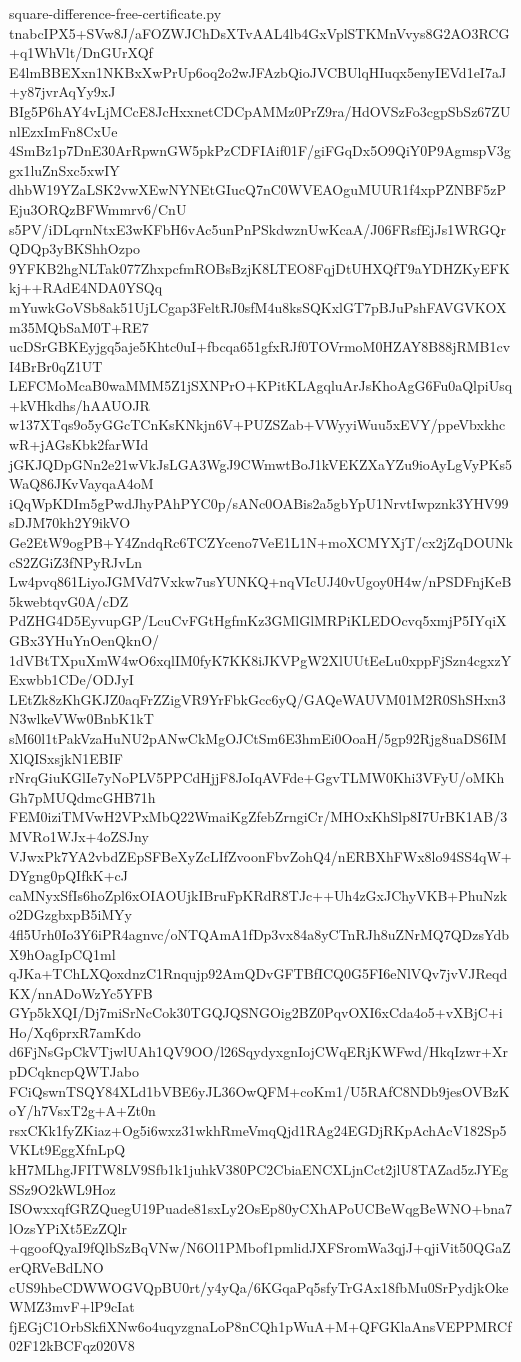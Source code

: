 \documentclass[11pt]{article}
\theoremstyle{definition}
\theoremstyle{remark}
\begin{document}
\begin{filecontents*}[overwrite]{square-difference-free-certificate.py}
tnabcIPX5+SVw8J/aFOZWJChDsXTvAAL4lb4GxVplSTKMnVvys8G2AO3RCG+q1WhVlt/DnGUrXQf
E4lmBBEXxn1NKBxXwPrUp6oq2o2wJFAzbQioJVCBUlqHIuqx5enyIEVd1eI7aJ+y87jvrAqYy9xJ
BIg5P6hAY4vLjMCcE8JcHxxnetCDCpAMMz0PrZ9ra/HdOVSzFo3cgpSbSz67ZUnlEzxImFn8CxUe
4SmBz1p7DnE30ArRpwnGW5pkPzCDFIAif01F/giFGqDx5O9QiY0P9AgmspV3ggx1luZnSxc5xwIY
dhbW19YZaLSK2vwXEwNYNEtGIucQ7nC0WVEAOguMUUR1f4xpPZNBF5zPEju3ORQzBFWmmrv6/CnU
s5PV/iDLqrnNtxE3wKFbH6vAc5unPnPSkdwznUwKcaA/J06FRsfEjJs1WRGQrQDQp3yBKShhOzpo
9YFKB2hgNLTak077ZhxpcfmROBsBzjK8LTEO8FqjDtUHXQfT9aYDHZKyEFKkj++RAdE4NDA0YSQq
mYuwkGoVSb8ak51UjLCgap3FeltRJ0sfM4u8ksSQKxlGT7pBJuPshFAVGVKOXm35MQbSaM0T+RE7
ucDSrGBKEyjgq5aje5Khtc0uI+fbcqa651gfxRJf0TOVrmoM0HZAY8B88jRMB1cvI4BrBr0qZ1UT
LEFCMoMcaB0waMMM5Z1jSXNPrO+KPitKLAgqluArJsKhoAgG6Fu0aQlpiUsq+kVHkdhs/hAAUOJR
w137XTqs9o5yGGcTCnKsKNkjn6V+PUZSZab+VWyyiWuu5xEVY/ppeVbxkhcwR+jAGsKbk2farWId
jGKJQDpGNn2e21wVkJsLGA3WgJ9CWmwtBoJ1kVEKZXaYZu9ioAyLgVyPKs5WaQ86JKvVayqaA4oM
iQqWpKDIm5gPwdJhyPAhPYC0p/sANc0OABis2a5gbYpU1NrvtIwpznk3YHV99sDJM70kh2Y9ikVO
Ge2EtW9ogPB+Y4ZndqRc6TCZYceno7VeE1L1N+moXCMYXjT/cx2jZqDOUNkcS2ZGiZ3fNPyRJvLn
Lw4pvq861LiyoJGMVd7Vxkw7usYUNKQ+nqVIcUJ40vUgoy0H4w/nPSDFnjKeB5kwebtqvG0A/cDZ
PdZHG4D5EyvupGP/LcuCvFGtHgfmKz3GMlGlMRPiKLEDOcvq5xmjP5IYqiXGBx3YHuYnOenQknO/
1dVBtTXpuXmW4wO6xqlIM0fyK7KK8iJKVPgW2XlUUtEeLu0xppFjSzn4cgxzYExwbb1CDe/ODJyI
LEtZk8zKhGKJZ0aqFrZZigVR9YrFbkGcc6yQ/GAQeWAUVM01M2R0ShSHxn3N3wlkeVWw0BnbK1kT
sM60l1tPakVzaHuNU2pANwCkMgOJCtSm6E3hmEi0OoaH/5gp92Rjg8uaDS6IMXlQISxsjkN1EBIF
rNrqGiuKGlIe7yNoPLV5PPCdHjjF8JoIqAVFde+GgvTLMW0Khi3VFyU/oMKhGh7pMUQdmcGHB71h
FEM0iziTMVwH2VPxMbQ22WmaiKgZfebZrngiCr/MHOxKhSlp8I7UrBK1AB/3MVRo1WJx+4oZSJny
VJwxPk7YA2vbdZEpSFBeXyZcLIfZvoonFbvZohQ4/nERBXhFWx8lo94SS4qW+DYgng0pQIfkK+cJ
caMNyxSfIs6hoZpl6xOIAOUjkIBruFpKRdR8TJc++Uh4zGxJChyVKB+PhuNzko2DGzgbxpB5iMYy
4fl5Urh0Io3Y6iPR4agnvc/oNTQAmA1fDp3vx84a8yCTnRJh8uZNrMQ7QDzsYdbX9hOagIpCQ1ml
qJKa+TChLXQoxdnzC1Rnqujp92AmQDvGFTBfICQ0G5FI6eNlVQv7jvVJReqdKX/nnADoWzYc5YFB
GYp5kXQI/Dj7miSrNcCok30TGQJQSNGOig2BZ0PqvOXI6xCda4o5+vXBjC+iHo/Xq6prxR7amKdo
d6FjNsGpCkVTjwlUAh1QV9OO/l26SqydyxgnIojCWqERjKWFwd/HkqIzwr+XrpDCqkncpQWTJabo
FCiQswnTSQY84XLd1bVBE6yJL36OwQFM+coKm1/U5RAfC8NDb9jesOVBzKoY/h7VsxT2g+A+Zt0n
rsxCKk1fyZKiaz+Og5i6wxz31wkhRmeVmqQjd1RAg24EGDjRKpAchAcV182Sp5VKLt9EggXfnLpQ
kH7MLhgJFITW8LV9Sfb1k1juhkV380PC2CbiaENCXLjnCct2jlU8TAZad5zJYEgSSz9O2kWL9Hoz
ISOwxxqfGRZQuegU19Puade81sxLy2OsEp80yCXhAPoUCBeWqgBeWNO+bna7lOzsYPiXt5EzZQlr
+qgoofQyaI9fQlbSzBqVNw/N6Ol1PMbof1pmlidJXFSromWa3qjJ+qjiVit50QGaZerQRVeBdLNO
cUS9hbeCDWWOGVQpBU0rt/y4yQa/6KGqaPq5sfyTrGAx18fbMu0SrPydjkOkeWMZ3mvF+lP9cIat
fjEGjC1OrbSkfiXNw6o4uqyzgnaLoP8nCQh1pWuA+M+QFGKlaAnsVEPPMRCf02F12kBCFqz020V8

\end{filecontents*}
\end{document}
